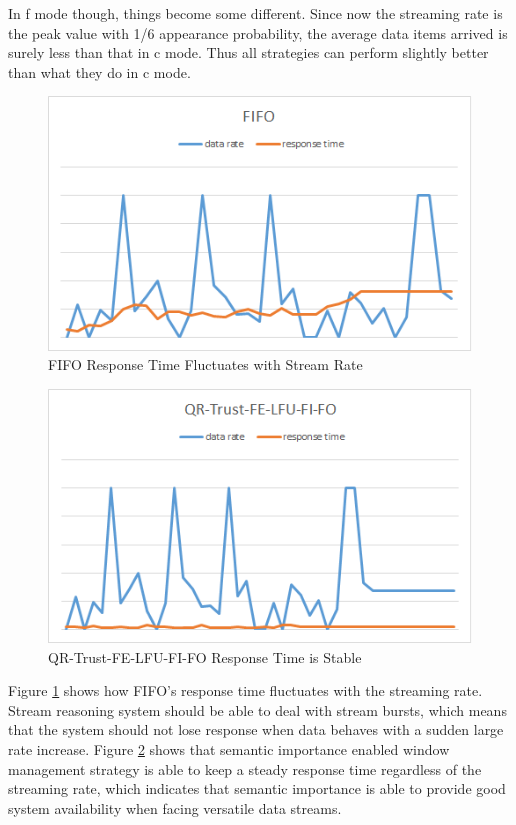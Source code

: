 In f mode though, things become some different. 
Since now the streaming rate is the peak value with 1/6 appearance probability, the average data items arrived is surely less than that in c mode. 
Thus all strategies can perform slightly better than what they do in c mode. 

\begin{figure}[!htbp]
	\centering
    \includegraphics[width=5in]{img/6-fluctuating.png}
    \caption{FIFO Response Time Fluctuates with Stream Rate}
    \label{fig:6-fluc}
\end{figure}

\begin{figure}[!htbp]
	\centering
    \includegraphics[width=5in]{img/6-flat.png}
    \caption{QR-Trust-FE-LFU-FI-FO Response Time is Stable}
   	\label{fig:6-flat}
\end{figure}

Figure \ref{fig:6-fluc} shows how FIFO's response time fluctuates with the streaming rate.
Stream reasoning system should be able to deal with stream bursts, which means that the system should not lose response when data behaves with a sudden large rate increase. 
Figure \ref{fig:6-flat} shows that semantic importance enabled window management strategy is able to keep a steady response time regardless of the streaming rate, which indicates that semantic importance is able to provide good system availability when facing versatile data streams. 
%
